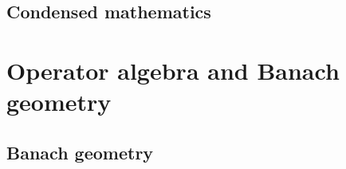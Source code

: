            
            
            
            
            

        \begin{appendices}
            \chapter{Condensed mathematics}
                \begin{abstract}
                
                \end{abstract}
                
                \minitoc
                
                
                
                
                
                
        \end{appendices}

    \part{Operator algebra and Banach geometry}
        \chapter{Banach geometry}
            \begin{abstract}
                
            \end{abstract}
            
            \minitoc
            
            
            
            
            
            
        
